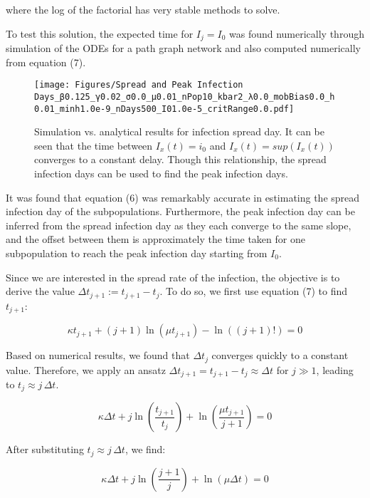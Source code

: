 where the log of the factorial has very stable methods to solve\cite{C}.

To test this solution, the expected time for $I_j = I_0$ was found numerically through simulation of the ODEs for a path graph network and also computed numerically from equation (7).

\begin{figure}[!ht]
    \centering
    \texttt{[image: Figures/Spread and Peak Infection Days\_β0.125\_γ0.02\_σ0.0\_μ0.01\_nPop10\_kbar2\_λ0.0\_mobBias0.0\_h0.01\_minh1.0e-9\_nDays500\_I01.0e-5\_critRange0.0.pdf]}
    \caption{\small Simulation vs. analytical results for infection spread day. It can be seen that the time between $I_x(t)=i_0$ and $I_x(t)=sup(I_x(t))$ converges to a constant delay. Though this relationship, the spread infection days can be used to find the peak infection days.}
\end{figure}

It was found that equation (6) was remarkably accurate in estimating the spread infection day of the subpopulations. Furthermore, the peak infection day can be inferred from the spread infection day as they each converge to the same slope, and the offset between them is approximately the time taken for one subpopulation to reach the peak infection day starting from $I_0$.

Since we are interested in the spread rate of the infection, the objective is to derive the value ${\Delta t}_{j+1} := t_{j+1}-t_j$. To do so, we first use equation (7) to find $t_{j+1}$:

\begin{equation}
\kappa t_{j+1} + (j+1) \ln(\mu t_{j+1}) - \ln((j+1)!) = 0 
\end{equation}

Based on numerical results, we found that ${\Delta t}_{j}$ converges quickly to a constant value. Therefore, we apply an ansatz ${\Delta t}_{j+1} = t_{j+1} - t_j \approx {\Delta t}$ for $j \gg 1$, leading to $t_j \approx j \, \Delta t$.


\begin{equation}
\kappa \Delta t + j \ln\left( \frac{t_{j+1}}{t_j} \right) + \ln\left( \frac{\mu t_{j+1}}{j+1} \right) = 0
\end{equation}

After substituting $t_j \approx j \, \Delta t$, we find:

\begin{equation}
\kappa \Delta t + j \ln\left( \frac{j+1}{j} \right) + \ln\left( \mu \Delta t \right) = 0 
\end{equation}

